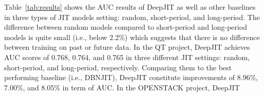 Table~\ref{tab:results} shows the AUC results of DeepJIT as well as other baselines in three types of JIT models setting: random, short-period, and long-period. The difference between random models compared to short-period and long-period models is quite small (i.e., below 2.2\%) which suggests that there is no difference between training on past or future data.  In the QT project, DeepJIT achieves AUC scores of 0.768, 0.764, and 0.765 in three different JIT settings: random, short-period, and long-period, respectively. Comparing them to the best performing baseline (i.e., DBNJIT), DeepJIT constitute improvements of 8.96\%, 7.00\%, and 8.05\% in term of AUC. In the OPENSTACK project, DeepJIT 

%
%
%



